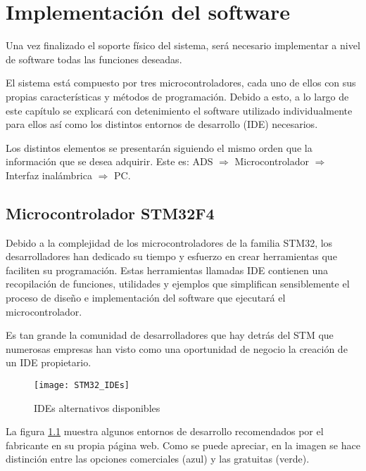 \chapter{Implementación del software\label{sec:Implementacion_soft}}

Una vez finalizado el soporte físico del sistema, será necesario implementar a nivel de software todas las funciones deseadas.

El sistema está compuesto por tres microcontroladores, cada uno de ellos con sus propias características y métodos de programación. Debido a esto, a lo largo de este capítulo se explicará con detenimiento el software utilizado individualmente para ellos así como los distintos entornos de desarrollo (\acrshort{IDE}) necesarios.

Los distintos elementos se presentarán siguiendo el mismo orden que la información que se desea adquirir. Este es:
ADS $\Rightarrow$ Microcontrolador $\Rightarrow$ Interfaz inalámbrica $\Rightarrow$ PC.

\section{Microcontrolador STM32F4\label{Software_micro}}

Debido a la complejidad de los microcontroladores de la familia STM32, los desarrolladores han dedicado su tiempo y esfuerzo en crear herramientas que faciliten su programación. Estas herramientas llamadas \acrshort{IDE} contienen una recopilación de funciones, utilidades y ejemplos que simplifican sensiblemente el proceso de diseño e implementación del software que ejecutará el microcontrolador.

Es tan grande la comunidad de desarrolladores que hay detrás del STM que numerosas empresas han visto como una oportunidad de negocio la creación de un \acrshort{IDE} propietario.

\clearpage

\begin{figure} [h]
    \centering
    \texttt{[image: STM32\_IDEs]}
    \caption{IDEs alternativos disponibles \cite{STM32_IDEs}}
    \label{fig:STM32_IDEs}
\end{figure}

La figura \ref{fig:STM32_IDEs} muestra algunos entornos de desarrollo recomendados por el fabricante en su propia página web. Como se puede apreciar, en la imagen se hace distinción entre las opciones comerciales (azul) y las gratuitas (verde).

